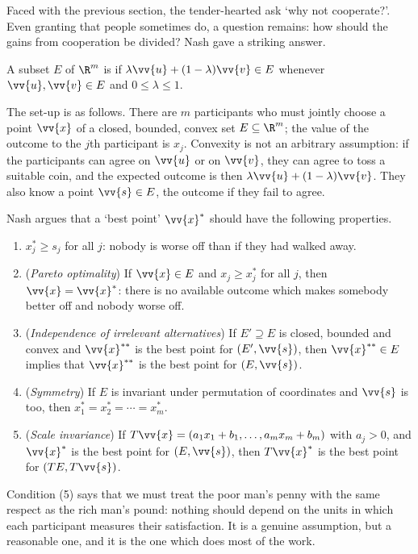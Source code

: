 Faced with the previous section, the tender-hearted ask `why not cooperate?'. Even granting that people sometimes do, a question remains: how should the gains from cooperation be divided? Nash gave a striking answer.

\begin{definition}
	A subset $E$ of $\R^m$ is  if $\lambda\vv{u} + (1-\lambda)\vv{v} \in E$ whenever $\vv{u},\vv{v}\in E$ and $0\leq \lambda\leq 1$.
\end{definition}

The set-up is as follows. There are $m$ participants who must jointly choose a point $\vv{x}$ of a closed, bounded, convex set $E \subseteq \R^m$; the value of the outcome to the $j$th participant is $x_j$. Convexity is not an arbitrary assumption: if the participants can agree on $\vv{u}$ or on $\vv{v}$, they can agree to toss a suitable coin, and the expected outcome is then $\lambda\vv{u}+(1-\lambda)\vv{v}$. They also know a  point $\vv{s} \in E$, the outcome if they fail to agree.

Nash argues that a `best point' $\vv{x}^*$ should have the following properties.
\begin{enumerate}[label=(\arabic*)]
	\item $x^*_j \geq s_j$ for all $j$: nobody is worse off than if they had walked away.
	\item (\emph{Pareto optimality}) If $\vv{x} \in E$ and $x_j \geq x_j^*$ for all $j$, then $\vv{x}=\vv{x}^*$: there is no available outcome which makes somebody better off and nobody worse off.
	\item (\emph{Independence of irrelevant alternatives}) If $E' \supseteq E$ is closed, bounded and convex and $\vv{x}^{**}$ is the best point for $(E',\vv{s})$, then $\vv{x}^{**}\in E$ implies that $\vv{x}^{**}$ is the best point for $(E,\vv{s})$.
	\item (\emph{Symmetry}) If $E$ is invariant under permutation of coordinates and $\vv{s}$ is too, then $x_1^*=x_2^*=\cdots=x_m^*$.
	\item (\emph{Scale invariance}) If $T\vv{x} = (a_1x_1+b_1,\ldots,a_mx_m+b_m)$ with $a_j>0$, and $\vv{x}^*$ is the best point for $(E,\vv{s})$, then $T\vv{x}^*$ is the best point for $(TE, T\vv{s})$.
\end{enumerate}
Condition (5) says that we must treat the poor man's penny with the same respect as the rich man's pound: nothing should depend on the units in which each participant measures their satisfaction. It is a genuine assumption, but a reasonable one, and it is the one which does most of the work.

